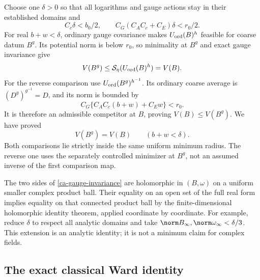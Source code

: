 Choose one $\delta>0$ so that all logarithms and gauge actions
stay in their established domains and
\begin{equation}\label{ca-comparison-margins}
 C_c\delta<b_0/2,\qquad
 C_G(C_AC_c+C_E)\delta<r_0/2.
\end{equation}
For real $b+w<\delta$, ordinary gauge covariance makes
$U_{\rm ord}(B)^h$ feasible for coarse datum $B^g$.
Its potential norm is below $r_0$, so minimality at $B^g$
and exact gauge invariance give
\[
 V(B^g)\le\mathcal S_\eta(U_{\rm ord}(B)^h)=V(B).
\]
For the reverse comparison use
$U_{\rm ord}(B^g)^{h^{-1}}$. Its ordinary coarse average is
$(D^g)^{g^{-1}}=D$, and its norm is bounded by
\[
 C_G\{C_AC_c(b+w)+C_Ew\}<r_0.
\]
It is therefore an admissible competitor at $B$, proving
$V(B)\le V(B^g)$. We have proved
\begin{equation}\label{ca-gauge-invariance}
 \boxed{\qquad V(B^g)=V(B)\qquad(b+w<\delta).\qquad}
\end{equation}
Both comparisons lie strictly inside the same uniform minimum
radius. The reverse one uses the separately controlled minimizer
at $B^g$, not an assumed inverse of the first comparison map.

The two sides of \eqref{ca-gauge-invariance} are holomorphic
in $(B,\omega)$ on a uniform smaller complex product ball.
Their equality on an open set of the full real form implies
equality on that connected product ball by the finite-dimensional
holomorphic identity theorem, applied coordinate by coordinate.
For example, reduce $\delta$ to respect all analytic domains
and take $\norm B_\infty,\norm\omega_\infty<\delta/3$.
This extension is an analytic identity; it is not a minimum
claim for complex fields.

\subsection{The exact classical Ward identity}
\label{ca-ward-section}

